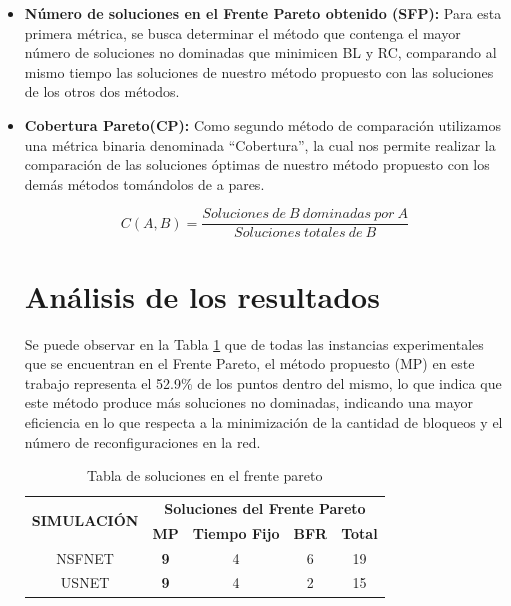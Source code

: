 \begin{itemize}
    \item \textbf{Número de soluciones en el Frente Pareto obtenido (SFP):} Para esta primera métrica, se busca determinar el método que contenga el mayor número de soluciones no dominadas que minimicen BL y RC, comparando al mismo tiempo las soluciones de nuestro método propuesto con las soluciones de los otros dos métodos. 
    
     \item \textbf{Cobertura Pareto(CP):} Como segundo método de comparación utilizamos una métrica binaria denominada “Cobertura”, la cual nos permite realizar la comparación de las soluciones óptimas de nuestro método propuesto con los demás métodos tomándolos de a pares.
 
 \begin{equation}
      C(A,B) = \frac{Soluciones\ de\ B\ dominadas\ por\ A}{Soluciones\ totales\ de\ B}  
 \end{equation}
    

\section{Análisis de los resultados}

Se puede observar en la Tabla \ref{tab:frentePareto} que de todas las instancias experimentales que se encuentran en el Frente Pareto, el método propuesto (MP) en este trabajo representa el 52.9\% de los puntos dentro del mismo, lo que indica que este método produce más soluciones no dominadas, indicando una mayor eficiencia en lo que respecta a la minimización de la cantidad de bloqueos y el número de reconfiguraciones en la red.

\begin{table}[h!]
    \centering
    \caption{Tabla de soluciones en el frente pareto}
    \begin{tabular}{|c|c|c|c|c|}
    \hline
    \multirow{2}{*}{\textbf{SIMULACIÓN}} & \multicolumn{4}{c|}{\textbf{Soluciones del Frente Pareto}}\\ \cline{2-5} 
         & \textbf{MP} & \textbf{Tiempo Fijo} & \textbf{BFR} & \textbf{Total}\\
    \hline
    NSFNET & \textbf{9} & 4 & 6 & 19\\
    USNET & \textbf{9} & 4 & 2 & 15\\
    \hline
    
    \end{tabular}
    \label{tab:frentePareto}
\end{table}


\end{itemize}

